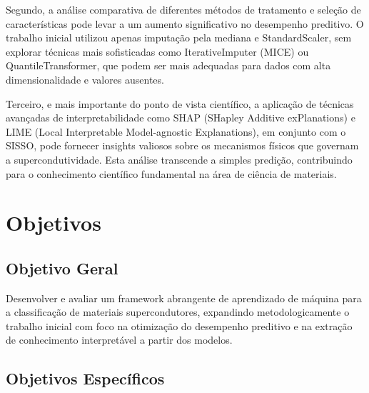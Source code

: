 \documentclass[12pt, a4paper]{article}
\begin{document}
Segundo, a análise comparativa de diferentes métodos de tratamento e seleção de características pode levar a um aumento significativo no desempenho preditivo. O trabalho inicial utilizou apenas imputação pela mediana e StandardScaler, sem explorar técnicas mais sofisticadas como IterativeImputer (MICE) ou QuantileTransformer, que podem ser mais adequadas para dados com alta dimensionalidade e valores ausentes.

Terceiro, e mais importante do ponto de vista científico, a aplicação de técnicas avançadas de interpretabilidade como SHAP (SHapley Additive exPlanations) e LIME (Local Interpretable Model-agnostic Explanations), em conjunto com o SISSO, pode fornecer insights valiosos sobre os mecanismos físicos que governam a supercondutividade. Esta análise transcende a simples predição, contribuindo para o conhecimento científico fundamental na área de ciência de materiais.

\section{Objetivos}

\subsection{Objetivo Geral}

Desenvolver e avaliar um framework abrangente de aprendizado de máquina para a classificação de materiais supercondutores, expandindo metodologicamente o trabalho inicial com foco na otimização do desempenho preditivo e na extração de conhecimento interpretável a partir dos modelos.

\subsection{Objetivos Específicos}
\end{document}
